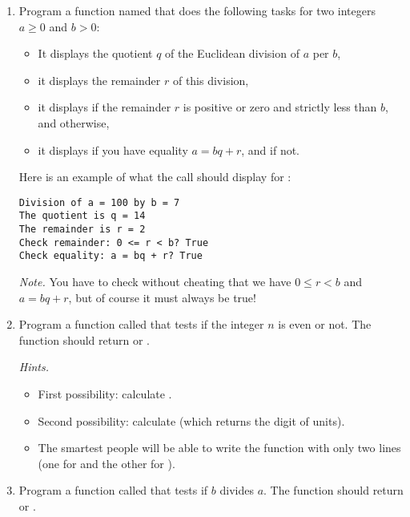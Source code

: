 \documentclass[11pt,class=report,crop=false]{standalone}
\begin{document}
\begin{activite}



\begin{enumerate}
  \item Program a function named  that does the following tasks for two integers $a\ge0$ and $b>0$:
  \begin{itemize}
    \item It displays the quotient $q$ of the Euclidean division of $a$ per $b$,
    \item it displays the remainder $r$ of this division,
    \item it displays  if the remainder $r$ is positive or zero and strictly less than $b$, and  otherwise,
    \item it displays  if you have equality $a = bq+r$, and  if not.
   \end{itemize}
    
Here is an example of what the call should display for :
\begin{lstlisting}  
Division of a = 100 by b = 7
The quotient is q = 14
The remainder is r = 2
Check remainder: 0 <= r < b? True
Check equality: a = bq + r? True
\end{lstlisting}

\emph{Note.} You have to check without cheating that we have $0 \le r<b$ and $a=bq+r$, but of course it must always be true!
  
  
  \item Program a function called  that tests if the integer $n$ is even or not. The function should return  or .
  
  \emph{Hints.}
  \begin{itemize}
    \item First possibility: calculate .
    \item Second possibility: calculate  (which returns the digit of units).
    \item The smartest people will be able to write the function with only two lines (one for  and the other for ).
   \end{itemize}
   
  \item Program a function called  that tests if $b$ divides $a$. The function should return  or .
  
\end{enumerate}   
     
\end{activite}
\end{document}
